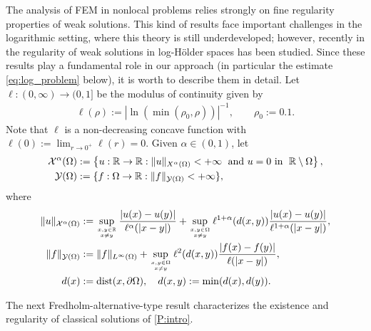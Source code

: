 \documentclass[11 pt]{article}
\numberwithin{equation}{section}
\def\dist{\operatorname{dist}}
\def\R{\mathbb{R}}
\begin{document}
The analysis of FEM in nonlocal problems relies strongly on fine regularity properties of weak solutions. This kind of results face important challenges in the logarithmic setting, where this theory is still underdeveloped; however, recently in \cite{CS22} the regularity of weak solutions in log-Hölder spaces has been studied.  Since these results play a fundamental role in our approach (in particular the estimate \eqref{eq:log_problem} below), it is worth to describe them in detail. Let $\ell:(0,\infty)\to (0,1]$ be the modulus of continuity given by
\begin{align}\label{ell:def}
\ell(\rho) := |\ln(\min(\rho_0,\rho))|^{-1}, \qquad\rho_0:=0.1.
\end{align}
Note that $\ell$ is a non-decreasing concave function with $\ell(0) := \lim_{r\to0^+}\ell(r)=0$. Given $\alpha\in(0,1)$, let
%
\begin{align}
    \mathcal X^\alpha(\Omega)&:=\left\{u:\mathbb R\to \mathbb R:\|u\|_{X^\alpha(\Omega)}<+\infty \;\textnormal{ and $u=0$ in }\; \R\setminus \Omega\right\}, \label{Xdef}\\
    \mathcal Y(\Omega)&:=\{f:\Omega\to \mathbb R:\|f\|_{\mathcal Y(\Omega)}<+\infty\},\notag
\end{align}
%
where
%
\begin{align*}
    \|u\|_{\mathcal X^\alpha(\Omega)}&:=\sup_{
    \genfrac{}{}{0pt}{}{x,y\in\mathbb R}{x\neq y}
    }\frac{|u(x)-u(y)|}{\ell^{\alpha}(|x-y|)}+\sup_{
\genfrac{}{}{0pt}{}{x,y\in\Omega}{x\neq y}
    }\ell^{1+\alpha}(d(x,y))\frac{|u(x)-u(y)|}{\ell^{1+\alpha}(|x-y|)}, \\
    \|f\|_{\mathcal Y(\Omega)}&:=\|f\|_{L^\infty(\Omega)}+\sup_{
    \genfrac{}{}{0pt}{}{x,y\in\Omega}{x\neq y}
    }\ell^{2}(d(x,y))\frac{|f(x)-f(y)|}{\ell(|x-y  |)}, \\
    d(x)&:=\dist(x,\partial \Omega), \quad d(x,y):=\min(d(x),d(y)).
\end{align*}

The next Fredholm-alternative-type result characterizes the existence and regularity of classical solutions of \eqref{P:intro}.
\end{document}
